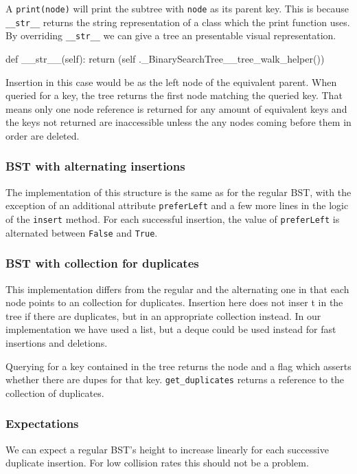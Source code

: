 \documentclass[fleqn,10pt]{SelfArx} %
\begin{document}
A \texttt{print(node)} will print the subtree with \texttt{node} as its parent key. This is because \texttt{\_\_str\_\_} returns the string representation of a class which the print function uses. By overriding \texttt{\_\_str\_\_} we can give a tree an presentable visual representation.
\begin{captioned_code}[title={For the documentation of the code, check Appendix A.}]
def __str__(self):
    return (self
    ._BinarySearchTree__tree_walk_helper())
\end{captioned_code}
Insertion in this case would be as the left node of the equivalent parent. When queried for a key, the tree returns the first node matching the queried key. That means only one node reference is returned for any amount of equivalent keys and the keys not returned are inaccessible unless the any nodes coming before them in order are deleted.

\subsubsection{BST with alternating insertions}
The implementation of this structure is the same as for the regular BST, with the exception of an additional attribute \texttt{preferLeft} and a few more lines in the logic of the \texttt{insert} method. For each successful insertion, the value of \texttt{preferLeft} is alternated between \texttt{False} and \texttt{True}.

\subsubsection{BST with collection for duplicates}
This implementation differs from the regular and the alternating one in that each node points to an collection for duplicates. Insertion here does not inser
t in the tree if there are duplicates, but in an appropriate collection instead. In our implementation we have used a list, but a deque could be used instead for fast insertions and deletions.

Querying for a key contained in the tree returns the node and a flag which asserts whether there are dupes for that key. \texttt{get\_duplicates} returns a reference to the collection of duplicates.

\subsubsection{Expectations}
We can expect a regular BST's height to increase linearly for each successive duplicate insertion. For low collision rates this should not be a problem. 
\end{document}
